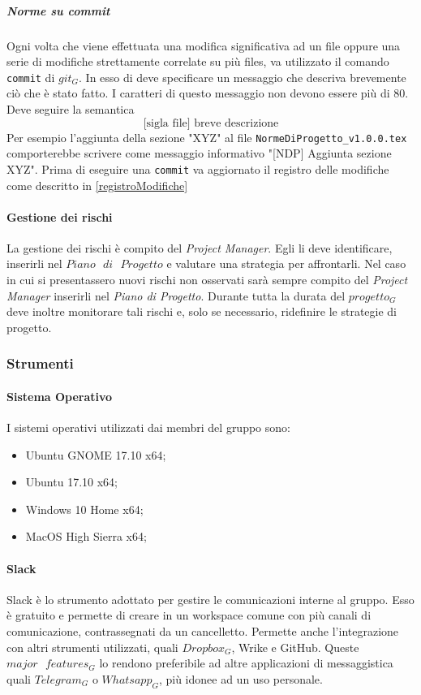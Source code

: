 			\subparagraph{Norme su commit}\Spazio
			Ogni volta che viene effettuata una modifica significativa ad un file oppure una serie di modifiche strettamente correlate su più files, va utilizzato il comando \texttt{commit} di $git_G$. In esso di deve specificare un messaggio che descriva brevemente ciò che è stato fatto. I caratteri di questo messaggio non devono essere più di 80. Deve seguire la semantica
			$$\text{[sigla file] breve descrizione}$$
			Per esempio l'aggiunta della sezione "XYZ" al file \texttt{NormeDiProgetto\_v1.0.0.tex} comporterebbe scrivere come messaggio informativo "[NDP] Aggiunta sezione XYZ". Prima di eseguire una \texttt{commit} va aggiornato il registro delle modifiche come descritto in \ref{registroModifiche}
			
		\paragraph{Gestione dei rischi} \Spazio
		La gestione dei rischi è compito del \emph{Project Manager}. Egli li deve identificare, inserirli nel $Piano\text{ }di\text{ }Progetto$ e valutare una strategia per affrontarli. Nel caso in cui si presentassero nuovi rischi non osservati sarà sempre compito del \emph{Project Manager} inserirli nel \emph{Piano di Progetto}. Durante tutta la durata del $progetto_G$ deve inoltre monitorare tali rischi e, solo se necessario, ridefinire le strategie di progetto.
		
	\subsubsection{Strumenti}
		\paragraph{Sistema Operativo} \Spazio
		I sistemi operativi utilizzati dai membri del gruppo sono:
		\begin{itemize}
			\item Ubuntu GNOME 17.10 x64;
			\item Ubuntu 17.10 x64;
			\item Windows 10 Home x64;
			\item MacOS High Sierra x64;
		\end{itemize}
		
		\paragraph{Slack}\Spazio
		Slack è lo strumento adottato per gestire le comunicazioni interne al gruppo. Esso è gratuito e permette di creare in un workspace comune con più canali di comunicazione, contrassegnati da un cancelletto. Permette anche l'integrazione con altri strumenti utilizzati, quali $Dropbox_G$, Wrike e GitHub. Queste $major\text{ }features_G$ lo rendono preferibile ad altre applicazioni di messaggistica quali $Telegram_G$ o $Whatsapp_G$, più idonee ad un uso personale. 
		
